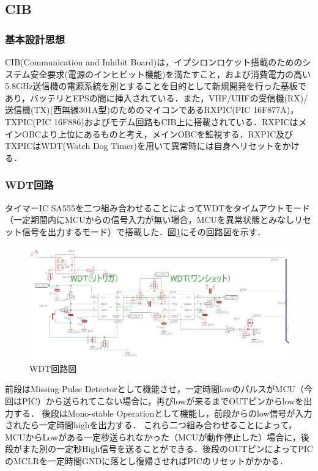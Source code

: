 
\subsection{CIB}
\subsubsection{基本設計思想}
CIB(Communication and Inhibit Board)は，イプシロンロケット搭載のためのシステム安全要求(電源のインヒビット機能)を満たすこと，および消費電力の高い5.8GHz送信機の電源系統を別とすることを目的として新規開発を行った基板であり，バッテリとEPSの間に挿入されている．また，VHF/UHFの受信機(RX)/送信機(TX)(西無線301A型)のためのマイコンであるRXPIC(PIC 16F877A)，TXPIC(PIC 16F886)およびモデム回路もCIB上に搭載されている．RXPICはメインOBCより上位にあるものと考え，メインOBCを監視する．RXPIC及びTXPICはWDT(Watch Dog Timer)を用いて異常時には自身へリセットをかける．

\subsubsection{WDT回路}
タイマーIC SA555を二つ組み合わせることによってWDTをタイムアウトモード（一定期間内にMCUからの信号入力が無い場合，MCUを異常状態とみなしリセット信号を出力するモード）で搭載した．図\ref{fig:wdt}にその回路図を示す．

\begin{figure}[htbp]
	\centering
	\includegraphics[width=\linewidth]{03/fig/wdt.png}
	\caption{WDT回路図}
	\label{fig:wdt}
\end{figure}

前段はMissing-Pulse Detectorとして機能させ，一定時間lowのパルスがMCU（今回はPIC）から送られてこない場合に，再びlowが来るまでOUTピンからlowを出力する．
後段はMono-stable Operationとして機能し，前段からのlow信号が入力されたら一定時間highを出力する．
これら二つ組み合わせることによって，MCUからLowがある一定秒送られなかった（MCUが動作停止した）場合に，後段がまた別の一定秒High信号を送ることができる．後段のOUTピンによってPICのMCLRを一定時間GNDに落とし復帰させればPICのリセットがかかる．


